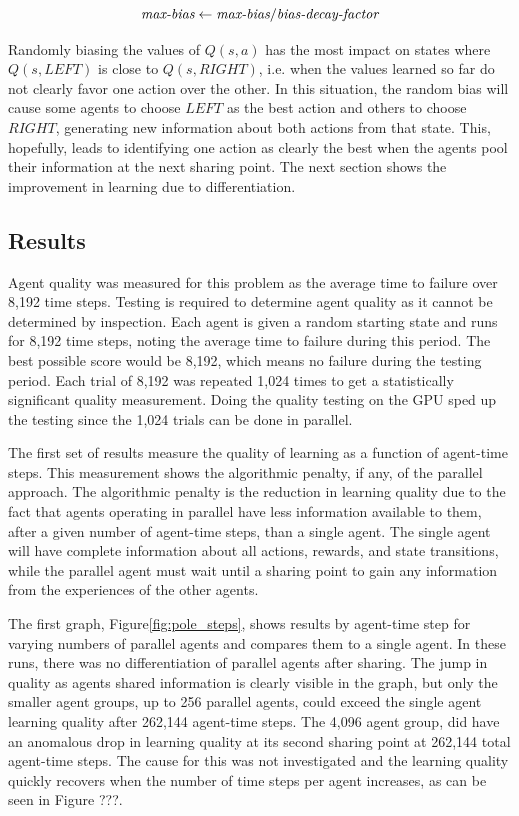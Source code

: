\documentclass[11pt]{article} %
\begin{document}
\begin{flushleft}
\begin{equation}
\mbox{\it max-bias} \gets \mbox{\it max-bias} / \mbox{\it bias-decay-factor}
\end{equation}

Randomly biasing the values of $Q(s,a)$ has the most impact on states where $Q(s,LEFT)$ is close to $Q(s,RIGHT)$, i.e. when the values learned so far do not clearly favor one action over the other.  In this situation, the random bias will cause some agents to choose $LEFT$ as the best action and others to choose $RIGHT$, generating new information about both actions from that state.  This, hopefully, leads to identifying one action as clearly the best when the agents pool their information at the next sharing point.  The next section shows the improvement in learning due to differentiation.

\subsection{Results}
Agent quality was measured for this problem as the average time to failure over 8,192 time steps.  Testing is required to determine agent quality as it cannot be determined by inspection.  Each agent is given a random starting state and runs for 8,192 time steps, noting the average time to failure during this period.  The best possible score would be 8,192, which means no failure during the testing period.  Each trial of 8,192 was repeated 1,024 times to get a statistically significant quality measurement.  Doing the quality testing on the GPU sped up the testing since the 1,024 trials can be done in parallel.

The first set of results measure the quality of learning as a function of agent-time steps.  This measurement shows the algorithmic penalty, if any, of the parallel approach.  The algorithmic penalty is the reduction in learning quality due to the fact that agents operating in parallel have less information available to them, after a given number of agent-time steps, than a single agent.  The single agent will have complete information about all actions, rewards, and state transitions, while the parallel agent must wait until a sharing point to gain any information from the experiences of the other agents.

The first graph, Figure\ref{fig:pole_steps}, shows results by agent-time step for varying numbers of parallel agents and compares them to a single agent.  In these runs, there was no differentiation of parallel agents after sharing.  The jump in quality as agents shared information is clearly visible in the graph, but only the smaller agent groups, up to 256 parallel agents, could exceed the single agent learning quality after 262,144 agent-time steps.  The 4,096 agent group, did have an anomalous drop in learning quality at its second sharing point at 262,144 total agent-time steps.  The cause for this was not investigated and the learning quality quickly recovers when the number of time steps per agent increases, as can be seen in Figure ???.

\end{flushleft}
\end{document}
